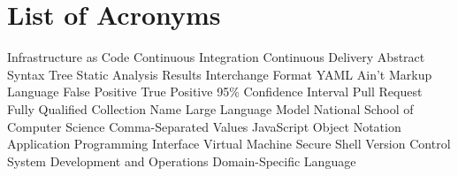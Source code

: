 \documentclass[12pt,a4paper]{report}
\begin{document}


\clearpage


\clearpage


\clearpage


\clearpage

\tableofcontents
\clearpage

\listoffigures
{}
\clearpage

\listoftables
{}
\clearpage

\chapter*{List of Acronyms}
\vspace{1cm}
\large
\begin{acronym}[ANSIBLEGUARD]
      {Infrastructure as Code}
       {Continuous Integration}
       {Continuous Delivery}
      {Abstract Syntax Tree}
    {Static Analysis Results Interchange Format}
     {YAML Ain't Markup Language}
       {False Positive}
       {True Positive}
     {95\% Confidence Interval}
       {Pull Request}
     {Fully Qualified Collection Name}
      {Large Language Model}
     {National School of Computer Science}
      {Comma-Separated Values}
     {JavaScript Object Notation}
      {Application Programming Interface}
       {Virtual Machine}
      {Secure Shell}
      {Version Control System}
   {Development and Operations}
      {Domain-Specific Language}
\end{acronym}
\vspace{1cm}
\normalsize
\clearpage

\pagestyle{fancy}
\cleardoublepage
{}










\clearpage
\appendix




\renewcommand{\bibname}{References}


\end{document}
